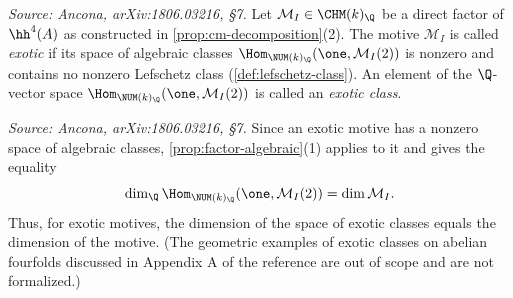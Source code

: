 \begin{definition}
  \label{def:exotic-motive}
  \textit{Source: Ancona, arXiv:1806.03216, §7.}
  Let \(\mathcal{M}_I \in \CHM(k)_{\Q}\) be a direct factor of \(\hh^{4}(A)\) as
  constructed in \cref{prop:cm-decomposition}(2). The motive \(\mathcal{M}_I\) is
  called \emph{exotic} if its space of algebraic classes
  \(\Hom_{\NUM(k)_\Q}(\one, \mathcal{M}_I(2))\) is nonzero and contains no nonzero
  Lefschetz class (\cref{def:lefschetz-class}). An element of the \(\Q\)-vector
  space \(\Hom_{\NUM(k)_\Q}(\one, \mathcal{M}_I(2))\) is called an \emph{exotic
  class}.
\end{definition}

\begin{remark}
  \label{rem:exotic-equal-dim}
  \textit{Source: Ancona, arXiv:1806.03216, §7.}
  Since an exotic motive has a nonzero space of algebraic classes,
  \cref{prop:factor-algebraic}(1) applies to it and gives the equality
  \[\dim_\Q \Hom_{\NUM(k)_\Q}(\one, \mathcal{M}_I(2)) = \dim \mathcal{M}_I.\]
  Thus, for exotic motives, the dimension of the space of exotic classes equals
  the dimension of the motive.
  (The geometric examples of exotic classes on abelian fourfolds discussed in
  Appendix A of the reference are out of scope and are not formalized.)
\end{remark}

